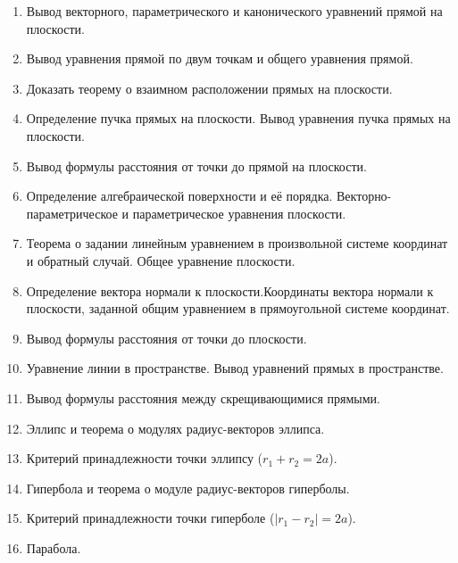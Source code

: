 \documentclass{article}
\begin{document}
\begin{enumerate}
	\item Вывод векторного, параметрического и канонического уравнений прямой на плоскости.
	\item Вывод уравнения прямой по двум точкам и общего уравнения прямой.
	\item Доказать теорему о взаимном расположении прямых на плоскости.
	\item Определение пучка прямых на плоскости. Вывод уравнения пучка прямых на плоскости.
	\item Вывод формулы расстояния от точки до прямой на плоскости.
	\item Определение алгебраической поверхности и её порядка. Векторно-параметрическое и параметрическое уравнения плоскости.
	\item Теорема о задании линейным уравнением в произвольной системе координат и обратный случай. Общее уравнение плоскости.
	\item Определение вектора нормали к плоскости.Координаты вектора нормали к плоскости, заданной общим уравнением в прямоугольной системе координат.
	\item Вывод формулы расстояния от точки до плоскости.
	\item Уравнение линии в пространстве. Вывод уравнений прямых в пространстве.
	\item Вывод формулы расстояния между скрещивающимися прямыми.
	\item Эллипс и теорема о модулях радиус-векторов эллипса.
	\item Критерий принадлежности точки эллипсу ($r_1 + r_2 = 2a$).
	\item Гипербола и теорема о модуле радиус-векторов гиперболы.
	\item Критерий принадлежности точки гиперболе ($|r_1 - r_2| = 2a$).
	\item Парабола.
\end{enumerate}
\end{document}
